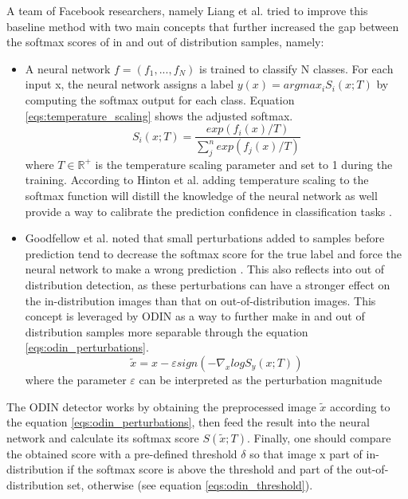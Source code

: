     A team of Facebook researchers, namely Liang et al. tried to improve this baseline method with two main concepts that further increased the gap between the softmax scores of in and out of distribution samples, namely:
    \begin{itemize}
        \item A neural network $f = (f_1, ..., f_N)$ is trained to classify N classes. For each input x, the neural network assigns a label $y(x) = argmax_{i}  S_{i}(x; T)$ by computing the softmax output for each class. Equation \ref{eqs:temperature_scaling} shows the adjusted softmax.
        \begin{equation}
            S_i(x; T) = \frac{exp(f_i(x)/T)}{\sum_{j}^{n}exp(f_j(x)/T)}
            \label{eqs:temperature_scaling}
        \end{equation}
        where $T \in \mathbb{R}^{+}$ is the temperature scaling parameter and set to 1 during the training. 
        According to Hinton et al. adding temperature scaling to the softmax function will distill the knowledge of the neural network \cite{Hinton2015} as well provide a way to calibrate the prediction confidence in classification tasks \cite{Guo2017}.
        
        \item Goodfellow et al. noted that small perturbations added to samples before prediction tend to decrease the softmax score for the true label and force the neural network to make a wrong prediction \cite{Goodfellow2015}. This also reflects into out of distribution detection, as these perturbations can have a stronger effect on the in-distribution images than that on out-of-distribution images. This concept is leveraged by ODIN as a way to further make in and out of distribution samples more separable through the equation \ref{eqs:odin_perturbations}.
        \begin{equation}
            \widetilde{x} = x-\varepsilon sign(-\nabla_{x} log S_{y}(x;T))
            \label{eqs:odin_perturbations}
        \end{equation}
        where the parameter $\varepsilon$ can be interpreted as the perturbation magnitude
    \end{itemize}
    The \ac{ODIN} detector works by obtaining the preprocessed image $\widetilde{x}$ according to the equation \ref{eqs:odin_perturbations}, then feed the result into the neural network and calculate its softmax score $S(\widetilde{x}; T)$. Finally, one should compare the obtained score with a pre-defined threshold $\delta$ so that image x part of in-distribution if the softmax score is above the threshold and part of the out-of-distribution set, otherwise (see equation \ref{eqs:odin_threshold}). 
